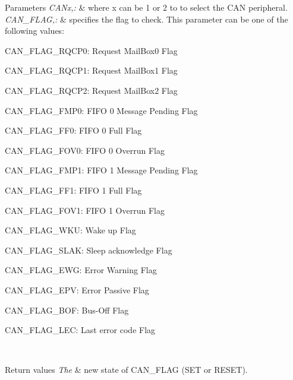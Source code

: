 \begin{DoxyParams}{Parameters}
{\em C\-A\-Nx,\-:} & where x can be 1 or 2 to to select the C\-A\-N peripheral. \\
\hline
{\em C\-A\-N\-\_\-\-F\-L\-A\-G,\-:} & specifies the flag to check. This parameter can be one of the following values\-: \begin{DoxyItemize}
\item C\-A\-N\-\_\-\-F\-L\-A\-G\-\_\-\-R\-Q\-C\-P0\-: Request Mail\-Box0 Flag \item C\-A\-N\-\_\-\-F\-L\-A\-G\-\_\-\-R\-Q\-C\-P1\-: Request Mail\-Box1 Flag \item C\-A\-N\-\_\-\-F\-L\-A\-G\-\_\-\-R\-Q\-C\-P2\-: Request Mail\-Box2 Flag \item C\-A\-N\-\_\-\-F\-L\-A\-G\-\_\-\-F\-M\-P0\-: F\-I\-F\-O 0 Message Pending Flag \item C\-A\-N\-\_\-\-F\-L\-A\-G\-\_\-\-F\-F0\-: F\-I\-F\-O 0 Full Flag \item C\-A\-N\-\_\-\-F\-L\-A\-G\-\_\-\-F\-O\-V0\-: F\-I\-F\-O 0 Overrun Flag \item C\-A\-N\-\_\-\-F\-L\-A\-G\-\_\-\-F\-M\-P1\-: F\-I\-F\-O 1 Message Pending Flag \item C\-A\-N\-\_\-\-F\-L\-A\-G\-\_\-\-F\-F1\-: F\-I\-F\-O 1 Full Flag \item C\-A\-N\-\_\-\-F\-L\-A\-G\-\_\-\-F\-O\-V1\-: F\-I\-F\-O 1 Overrun Flag \item C\-A\-N\-\_\-\-F\-L\-A\-G\-\_\-\-W\-K\-U\-: Wake up Flag \item C\-A\-N\-\_\-\-F\-L\-A\-G\-\_\-\-S\-L\-A\-K\-: Sleep acknowledge Flag \item C\-A\-N\-\_\-\-F\-L\-A\-G\-\_\-\-E\-W\-G\-: Error Warning Flag \item C\-A\-N\-\_\-\-F\-L\-A\-G\-\_\-\-E\-P\-V\-: Error Passive Flag \item C\-A\-N\-\_\-\-F\-L\-A\-G\-\_\-\-B\-O\-F\-: Bus-\/\-Off Flag \item C\-A\-N\-\_\-\-F\-L\-A\-G\-\_\-\-L\-E\-C\-: Last error code Flag \end{DoxyItemize}
\\
\hline
\end{DoxyParams}

\begin{DoxyRetVals}{Return values}
{\em The} & new state of C\-A\-N\-\_\-\-F\-L\-A\-G (S\-E\-T or R\-E\-S\-E\-T). \\
\hline
\end{DoxyRetVals}


